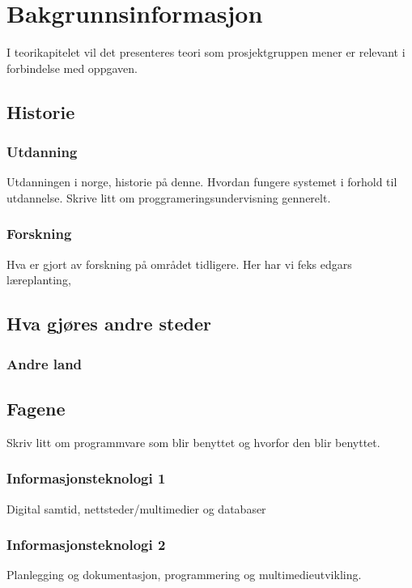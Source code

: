 \cleardoublepage
\chapter{Bakgrunnsinformasjon}
\label{chap:theory}
I teorikapitelet vil det presenteres teori som prosjektgruppen mener er relevant i forbindelse med oppgaven. 

\section{Historie}


\subsection{Utdanning}
{\color{red} Utdanningen i norge, historie på denne. Hvordan fungere systemet i forhold til utdannelse.
Skrive litt om proggrameringsundervisning gennerelt.}
\subsection{Forskning}
{\color{red} Hva er gjort av forskning på området tidligere. Her har vi feks edgars læreplanting, }

\section{Hva gjøres andre steder}

\subsection {Andre land}

\section{Fagene}

{\color{red}
Skriv litt om programmvare som blir benyttet og hvorfor den blir benyttet.}

\subsection{Informasjonsteknologi 1}
Digital samtid, nettsteder/multimedier og databaser
\subsection{Informasjonsteknologi 2}
Planlegging og dokumentasjon, programmering og multimedieutvikling. 
 







